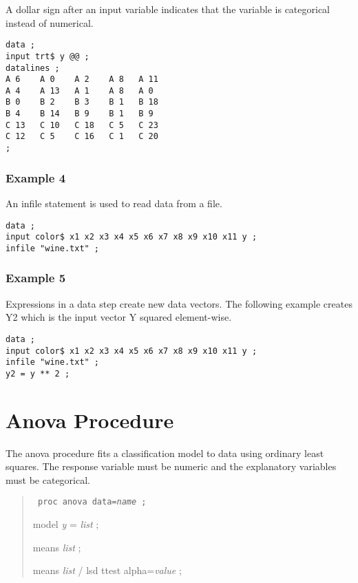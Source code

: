 \documentclass[12pt]{article}
\begin{document}
A dollar sign after an input variable indicates that the variable
is categorical instead of numerical.

{\footnotesize\begin{verbatim}
data ;
input trt$ y @@ ;
datalines ;
A 6    A 0    A 2    A 8   A 11
A 4    A 13   A 1    A 8   A 0
B 0    B 2    B 3    B 1   B 18
B 4    B 14   B 9    B 1   B 9
C 13   C 10   C 18   C 5   C 23
C 12   C 5    C 16   C 1   C 20
;
\end{verbatim}}

\subsubsection*{Example 4}

An infile statement is used to read data from a file.

{\footnotesize\begin{verbatim}
data ;
input color$ x1 x2 x3 x4 x5 x6 x7 x8 x9 x10 x11 y ;
infile "wine.txt" ;
\end{verbatim}}

\subsubsection*{Example 5}

Expressions in a data step create new data vectors.
The following example creates Y2 which is the input
vector Y squared element-wise.

{\footnotesize\begin{verbatim}
data ;
input color$ x1 x2 x3 x4 x5 x6 x7 x8 x9 x10 x11 y ;
infile "wine.txt" ;
y2 = y ** 2 ;
\end{verbatim}}

\newpage

\section{Anova Procedure}

The anova procedure fits a classification model
to data using ordinary least squares.
The response variable must be numeric and the
explanatory variables must be categorical.

\begin{quote}
{\tt
proc anova data={\it name} ;

model {\it y} = {\it list} ;

means {\it list} ;

means {\it list} / lsd ttest alpha={\it value} ;
}
\end{quote}
\end{document}
